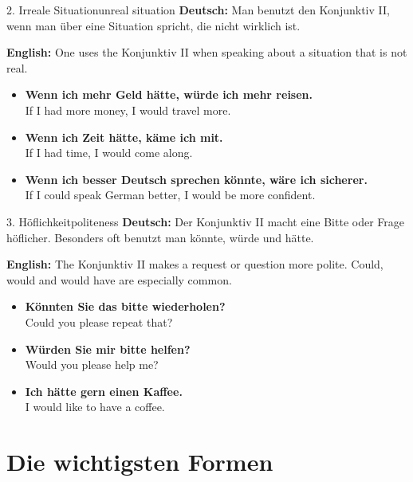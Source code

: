 \documentclass[a4paper,11pt]{article}
\newcommand{\GermanText}[1]{\textbf{Deutsch: }#1\par}
\newcommand{\EnglishText}[1]{{\small\color{SoftGray}\textbf{English: }#1\par}}
\newcommand{\ExampleItem}[2]{\item \textbf{#1}\\{\small\color{SoftGray}#2}}
\begin{document}
    \begin{grammarentry}{2. Irreale Situation}{unreal situation}
        \GermanText{Man benutzt den Konjunktiv II, wenn man über eine Situation spricht, die nicht wirklich ist.}
        \EnglishText{One uses the Konjunktiv II when speaking about a situation that is not real.}
        
        \begin{exbox}
            \begin{itemize}
                \ExampleItem{Wenn ich mehr Geld hätte, würde ich mehr reisen.}{If I had more money, I would travel more.}
                \ExampleItem{Wenn ich Zeit hätte, käme ich mit.}{If I had time, I would come along.}
                \ExampleItem{Wenn ich besser Deutsch sprechen könnte, wäre ich sicherer.}{If I could speak German better, I would be more confident.}
            \end{itemize}
        \end{exbox}
    \end{grammarentry}
    
    \begin{grammarentry}{3. Höflichkeit}{politeness}
        \GermanText{Der Konjunktiv II macht eine Bitte oder Frage höflicher. Besonders oft benutzt man könnte, würde und hätte.}
        \EnglishText{The Konjunktiv II makes a request or question more polite. Could, would and would have are especially common.}
        
        \begin{exbox}
            \begin{itemize}
                \ExampleItem{Könnten Sie das bitte wiederholen?}{Could you please repeat that?}
                \ExampleItem{Würden Sie mir bitte helfen?}{Would you please help me?}
                \ExampleItem{Ich hätte gern einen Kaffee.}{I would like to have a coffee.}
            \end{itemize}
        \end{exbox}
    \end{grammarentry}
    
    \section{Die wichtigsten Formen}
    
\end{document}
